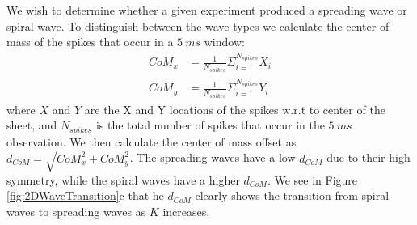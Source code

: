 \documentclass[12pt]{article}
\begin{document}
We wish to determine whether a given experiment produced a spreading wave or spiral wave.
To distinguish between the wave types we calculate the center of mass of the spikes that occur in a $5~ms$ window:
\begin{align}
 CoM_x &= \frac{1}{N_{spikes}}\Sigma_{i=1}^{N_{spikes}} X_i\\
 CoM_y &= \frac{1}{N_{spikes}}\Sigma_{i=1}^{N_{spikes}} Y_i
\end{align}
where $X$ and $Y$ are the X and Y locations of the spikes w.r.t to center of the sheet, and $N_{spikes}$ is the total number of spikes that occur in the $5~ms$ observation.
We then calculate the center of mass offset as $d_{CoM}=\sqrt{CoM_x^2 + CoM_y^2}$.
The spreading waves have a low $d_{CoM}$ due to their high symmetry, while the spiral waves have a higher $d_{CoM}$.
We see in Figure \ref{fig:2DWaveTransition}c that he $d_{CoM}$ clearly shows the transition from spiral waves to spreading waves as $K$ increases.
\end{document}
